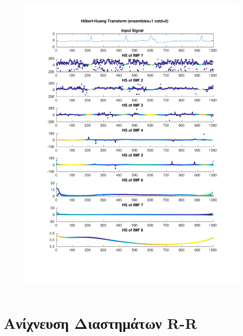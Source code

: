\documentclass{beamer}
\begin{document}
\begin{frame}
\begin{columns}
\begin{figure}
\includegraphics[width=\textwidth]{fig/221l1_hht.pdf}
\end{figure}
\end{columns}
\end{frame}


\section{Ανίχνευση Διαστημάτων R-R}
\end{document}

